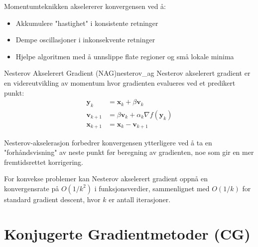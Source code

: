 Momentumteknikken akselererer konvergensen ved å:
\begin{itemize}
	\item Akkumulere "hastighet" i konsistente retninger
	\item Dempe oscillasjoner i inkonsekvente retninger
	\item Hjelpe algoritmen med å unnslippe flate regioner og små lokale minima
\end{itemize}

\begin{definition}{Nesterov Akselerert Gradient (NAG)}{nesterov_ag}
	Nesterov akselerert gradient er en videreutvikling av momentum hvor gradienten evalueres ved et predikert punkt:
	\begin{align*}
		\symbf{y}_k     & = \symbf{x}_k + \beta \symbf{v}_k                    \\
		\symbf{v}_{k+1} & = \beta \symbf{v}_k + \alpha_k \nabla f(\symbf{y}_k) \\
		\symbf{x}_{k+1} & = \symbf{x}_k - \symbf{v}_{k+1}
	\end{align*}
\end{definition}

Nesterov-akselerasjon forbedrer konvergensen ytterligere ved å ta en "forhåndsvisning" av neste punkt før beregning av gradienten, noe som gir en mer fremtidsrettet korrigering.

For konvekse problemer kan Nesterov akselerert gradient oppnå en konvergensrate på \(O(1/k^2)\) i funksjonsverdier, sammenlignet med \(O(1/k)\) for standard gradient descent, hvor \(k\) er antall iterasjoner.

\section{Konjugerte Gradientmetoder (CG)}
\label{sec:cg_methods}

